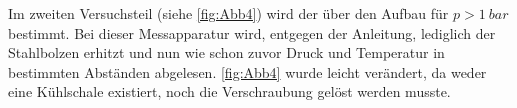 Im zweiten Versuchsteil (siehe \cref{fig:Abb4}) wird der über den Aufbau für 
$p > \SI{1}{bar}$ bestimmt.
Bei dieser Messapparatur wird, entgegen der Anleitung, lediglich der Stahlbolzen erhitzt und nun wie schon zuvor Druck und Temperatur in bestimmten Abständen abgelesen.
\cref{fig:Abb4} wurde leicht verändert, da weder eine Kühlschale existiert, noch die Verschraubung gelöst werden musste. 
